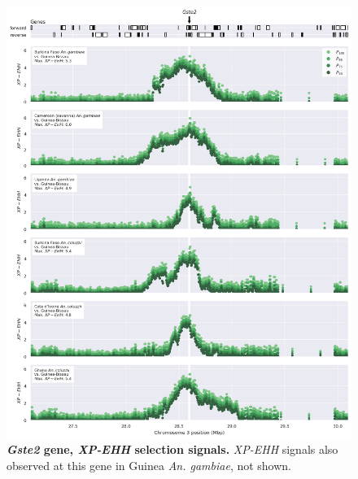 \documentclass[a4paper,11pt,abstracton,hidelinks]{scrartcl}
\begin{document}
\begin{figure}[t!]
	\begin{center}
		\includegraphics*[width=1.1\linewidth,center]{artwork/locus_gste2_xpehh.png}
	\end{center}
	\caption[\textit{Gste2} gene, \textit{XP-EHH} selection signals]{
	\textbf{\textit{Gste2} gene, \textit{XP-EHH} selection signals.}
	\textit{XP-EHH} signals also observed at this gene in Guinea \textit{An. gambiae}, not shown. 
	} 
	\label{fig:locus_gste2_xpehh}
\end{figure}
\end{document}
